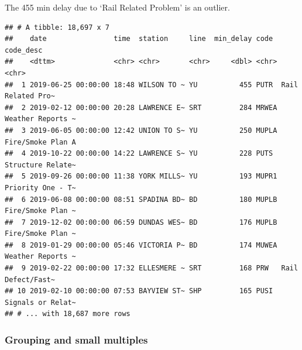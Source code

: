 \documentclass[
]{book}
\newenvironment{Shaded}{\begin{snugshade}}{\end{snugshade}}
\newcommand{\DataTypeTok}[1]{\textcolor[rgb]{0.13,0.29,0.53}{#1}}
\newcommand{\DecValTok}[1]{\textcolor[rgb]{0.00,0.00,0.81}{#1}}
\newcommand{\KeywordTok}[1]{\textcolor[rgb]{0.13,0.29,0.53}{\textbf{#1}}}
\newcommand{\NormalTok}[1]{#1}
\newcommand{\OperatorTok}[1]{\textcolor[rgb]{0.81,0.36,0.00}{\textbf{#1}}}
\newcommand{\StringTok}[1]{\textcolor[rgb]{0.31,0.60,0.02}{#1}}
\begin{document}
The 455 min delay due to `Rail Related Problem' is an outlier.

\begin{Shaded}
\end{Shaded}

\begin{verbatim}
## # A tibble: 18,697 x 7
##    date                time  station     line  min_delay code  code_desc        
##    <dttm>              <chr> <chr>       <chr>     <dbl> <chr> <chr>            
##  1 2019-06-25 00:00:00 18:48 WILSON TO ~ YU          455 PUTR  Rail Related Pro~
##  2 2019-02-12 00:00:00 20:28 LAWRENCE E~ SRT         284 MRWEA Weather Reports ~
##  3 2019-06-05 00:00:00 12:42 UNION TO S~ YU          250 MUPLA Fire/Smoke Plan A
##  4 2019-10-22 00:00:00 14:22 LAWRENCE S~ YU          228 PUTS  Structure Relate~
##  5 2019-09-26 00:00:00 11:38 YORK MILLS~ YU          193 MUPR1 Priority One - T~
##  6 2019-06-08 00:00:00 08:51 SPADINA BD~ BD          180 MUPLB Fire/Smoke Plan ~
##  7 2019-12-02 00:00:00 06:59 DUNDAS WES~ BD          176 MUPLB Fire/Smoke Plan ~
##  8 2019-01-29 00:00:00 05:46 VICTORIA P~ BD          174 MUWEA Weather Reports ~
##  9 2019-02-22 00:00:00 17:32 ELLESMERE ~ SRT         168 PRW   Rail Defect/Fast~
## 10 2019-02-10 00:00:00 07:53 BAYVIEW ST~ SHP         165 PUSI  Signals or Relat~
## # ... with 18,687 more rows
\end{verbatim}

\hypertarget{grouping-and-small-multiples}{%
\subsubsection{Grouping and small multiples}\label{grouping-and-small-multiples}}
\end{document}
